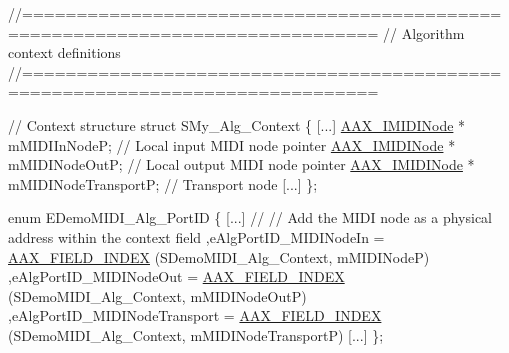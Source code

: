\begin{DoxyCode}
\textcolor{comment}{//==============================================================================}
\textcolor{comment}{// Algorithm context definitions}
\textcolor{comment}{//==============================================================================}

\textcolor{comment}{// Context structure}
\textcolor{keyword}{struct }SMy\_Alg\_Context
\{
    [...]
    \hyperlink{a00105}{AAX\_IMIDINode}  * mMIDIInNodeP;         \textcolor{comment}{// Local input MIDI node pointer}
    \hyperlink{a00105}{AAX\_IMIDINode}  * mMIDINodeOutP;        \textcolor{comment}{// Local output MIDI node pointer}
    \hyperlink{a00105}{AAX\_IMIDINode}  * mMIDINodeTransportP;  \textcolor{comment}{// Transport node }
    [...]
\};

\textcolor{keyword}{enum} EDemoMIDI\_Alg\_PortID
\{
    [...]
    \textcolor{comment}{//}
    \textcolor{comment}{// Add the MIDI node as a physical address within the context field}
    ,eAlgPortID\_MIDINodeIn          = \hyperlink{a00149_acf807247ecd6e5899dc9dc31644e9a1d}{AAX\_FIELD\_INDEX} (SDemoMIDI\_Alg\_Context, mMIDINodeP)
    ,eAlgPortID\_MIDINodeOut         = \hyperlink{a00149_acf807247ecd6e5899dc9dc31644e9a1d}{AAX\_FIELD\_INDEX} (SDemoMIDI\_Alg\_Context, mMIDINodeOutP)
    ,eAlgPortID\_MIDINodeTransport   = \hyperlink{a00149_acf807247ecd6e5899dc9dc31644e9a1d}{AAX\_FIELD\_INDEX} (SDemoMIDI\_Alg\_Context, 
      mMIDINodeTransportP)
    [...]
\};
\end{DoxyCode}



